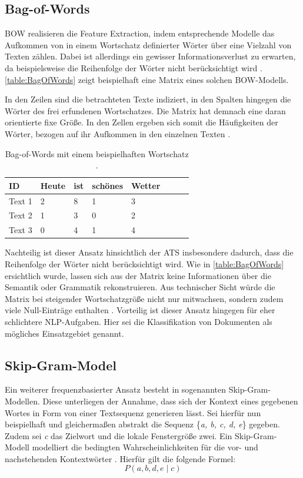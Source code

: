 \subsection{Bag-of-Words}
\noindent
\ac{BOW} realisieren die Feature Extraction, indem entsprechende Modelle das Aufkommen von in einem Wortschatz definierter Wörter über eine Vielzahl von Texten zählen. Dabei ist allerdings ein gewisser Informationsverlust zu erwarten, da beispielsweise die Reihenfolge der Wörter nicht berücksichtigt wird \cite[S.~262]{RAS19}. \autoref{table:BagOfWords} zeigt beispielhaft eine Matrix eines solchen \ac{BOW}-Modells.
\newpage

\noindent
In den Zeilen sind die betrachteten Texte indiziert, in den Spalten hingegen die Wörter des frei erfundenen Wortschatzes. Die Matrix hat demnach eine daran orientierte fixe Größe. In den Zellen ergeben sich somit die Häufigkeiten der Wörter, bezogen auf ihr Aufkommen in den einzelnen Texten \cite{BRO19}.

\begin{table}[htb]
\centering
\begin{tabular}{ | p{1.8cm} | p{1.8cm} | p{1.8cm} | p{1.8cm} | p{1.8cm} | p{1.8cm} | p{1.8cm} | p{1.8cm} | }
\hline
\textbf{ID} & \textbf{Heute} & \textbf{ist} & \textbf{schönes} & \textbf{Wetter} \\
\hline
Text 1 & 2 & 8 & 1 & 3 \\
\hline
Text 2 & 1 & 3 & 0 & 2 \\
\hline
Text 3 & 0 & 4 & 1 & 4 \\
\hline
\end{tabular}
\caption{Bag-of-Words mit einem beispielhaften Wortschatz \cite{HUI20}.}
\label{table:BagOfWords}
\end{table}

\noindent
Nachteilig ist dieser Ansatz hinsichtlich der \ac{ATS} insbesondere dadurch, dass die Reihenfolge der Wörter nicht berücksichtigt wird. Wie in \autoref{table:BagOfWords} ersichtlich wurde, lassen sich aus der Matrix keine Informationen über die Semantik oder Grammatik rekonstruieren. Aus technischer Sicht würde die Matrix bei steigender Wortschatzgröße nicht nur mitwachsen, sondern zudem viele Null-Einträge enthalten \cite{HUI20}. Vorteilig ist dieser Ansatz hingegen für eher schlichtere \ac{NLP}-Aufgaben. Hier sei die Klassifikation von Dokumenten als mögliches Einsatzgebiet genannt.


\subsection{Skip-Gram-Model}
\noindent
Ein weiterer frequenzbasierter Ansatz besteht in sogenannten Skip-Gram-Modellen. Diese unterliegen der Annahme, dass sich der Kontext eines gegebenen Wortes in Form von einer Textsequenz generieren lässt. Sei hierfür nun beispielhaft und gleichermaßen abstrakt die Sequenz {\{\textit{a, b, c, d, e}\}} gegeben. Zudem sei \textit{c} das Zielwort und die lokale Fenstergröße zwei. Ein Skip-Gram-Modell modelliert die bedingten Wahrscheinlichkeiten für die vor- und nachstehenden Kontextwörter \cite[S.~640]{ZHA20}. Hierfür gilt die folgende Formel: $$P(a, b, d, e \mid c)$$

